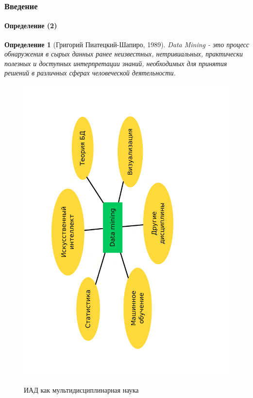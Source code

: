\documentclass[xcolor=table]{beamer}
\newtheorem{defn}{Определение}
\begin{document}
\begin{frame}
  \frametitle{Введение}
  \framesubtitle{Определение (2)}
  \begin{defn}[Григорий Пиатецкий-Шапиро, 1989]
    Data Mining - это процесс обнаружения в сырых данных ранее неизвестных, нетривиальных, практически полезных и доступных интерпретации знаний, необходимых для принятия решений в различных сферах человеческой деятельности.
  \end{defn}
  \vspace{-15pt}
  \begin{figure}
    {\includegraphics[angle=270,scale=0.3,clip=true,trim=23mm 25mm 53mm 30mm]{data/diag1}}
    \vspace{-5pt}
    \caption{ИАД как мультидисциплинарная наука}
  \end{figure}
\end{frame}
\end{document}
